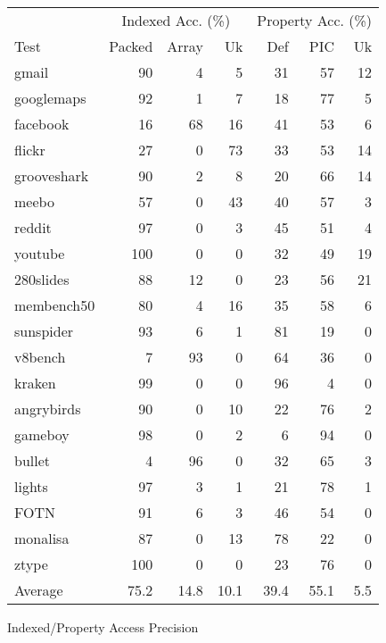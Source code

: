 \begin{figure}
\centering
\begin{tabular}{lrrrrrr}
\toprule
     & \multicolumn{3}{c}{Indexed Acc. (\%)}
     & \multicolumn{3}{c}{Property Acc. (\%)} \\
\cmidrule(r){2-4}
\cmidrule{5-7}
Test & Packed & Array & Uk
     & Def & PIC & Uk \\
\midrule
gmail          & 90 & 4 & 5 & 31 & 57 & 12 \\
googlemaps     & 92 & 1 & 7 & 18 & 77 & 5 \\
facebook       & 16 & 68 & 16 & 41 & 53 & 6 \\
flickr         & 27 & 0 & 73 & 33 & 53 & 14 \\
grooveshark    & 90 & 2 & 8 & 20 & 66 & 14 \\
meebo          & 57 & 0 & 43 & 40 & 57 & 3 \\
reddit         & 97 & 0 & 3 & 45 & 51 & 4 \\
youtube        & 100 & 0 & 0 & 32 & 49 & 19 \\
280slides      & 88 & 12 & 0 & 23 & 56 & 21 \\
membench50     & 80 & 4 & 16 & 35 & 58 & 6 \\
\midrule
sunspider      & 93 & 6 & 1 & 81 & 19 & 0 \\
v8bench        & 7 & 93 & 0 & 64 & 36 & 0 \\
kraken         & 99 & 0 & 0 & 96 & 4 & 0 \\
\midrule
angrybirds     & 90 & 0 & 10 & 22 & 76 & 2 \\
gameboy        & 98 & 0 & 2 & 6 & 94 & 0 \\
bullet         & 4 & 96 & 0 & 32 & 65 & 3 \\
lights         & 97 & 3 & 1 & 21 & 78 & 1 \\
FOTN           & 91 & 6 & 3 & 46 & 54 & 0 \\
monalisa       & 87 & 0 & 13 & 78 & 22 & 0 \\
ztype          & 100 & 0 & 0 & 23 & 76 & 0 \\
\midrule
Average        & 75.2 & 14.8 & 10.1 & 39.4 & 55.1 & 5.5 \\
\bottomrule
\end{tabular}
\nocaptionrule \caption{Indexed/Property Access Precision}
\label{fig:access_objects}
\end{figure}

